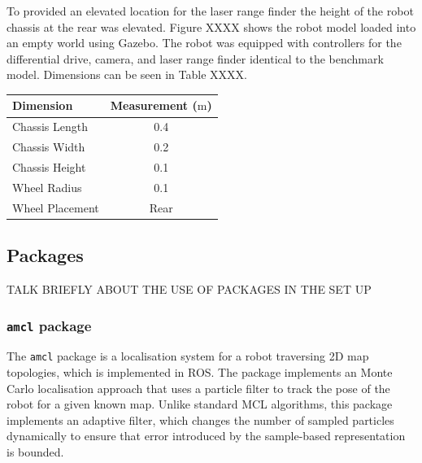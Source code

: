 \documentclass[a4paper]{article}
\begin{document}
\begin{minipage}{0.45\textwidth}
To provided an elevated location for the laser range finder the height of the robot chassis at the rear was elevated. Figure XXXX shows the robot model loaded into an empty world using Gazebo. The robot was equipped with controllers for the differential drive, camera, and laser range finder identical to the benchmark model. Dimensions can be seen in Table XXXX.
\end{minipage}
\hspace{1cm}
\begin{minipage}{0.45\textwidth}
\centering
{}
\begin{tabular}{lc}
\toprule
\textbf{Dimension} & \textbf{Measurement ($\si{\meter}$)} \\
\midrule
Chassis Length & 0.4\\
Chassis Width & 0.2\\
Chassis Height & 0.1\\
Wheel Radius & 0.1\\
Wheel Placement & Rear\\
\bottomrule
\end{tabular}
\end{minipage}

\newpage

\subsection{Packages}
TALK BRIEFLY ABOUT THE USE OF PACKAGES IN THE SET UP
\subsubsection{\texttt{amcl} package}
The \texttt{amcl} package is a localisation system for a robot traversing 2D map topologies, which is implemented in ROS. The package implements an Monte Carlo localisation approach that uses a particle filter to track the pose of the robot for a given known map. Unlike standard MCL algorithms, this package implements an adaptive filter, which changes the number of sampled particles dynamically to ensure that error introduced by the sample-based representation is bounded.
\end{document}
